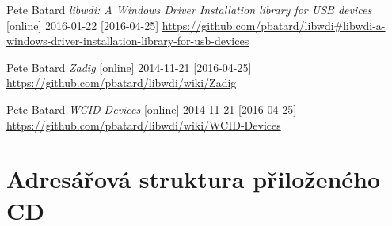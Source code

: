 \documentclass[czech,master,public,dept460,male,cpdeclaration]{diploma}	%
\begin{document}
\begin{thebibliography}{99}
 Pete Batard
\textit{libwdi: A Windows Driver Installation library for USB devices} [online] 2016-01-22 [2016-04-25]
\url{https://github.com/pbatard/libwdi#libwdi-a-windows-driver-installation-library-for-usb-devices}

 Pete Batard
\textit{Zadig} [online] 2014-11-21 [2016-04-25]
\url{https://github.com/pbatard/libwdi/wiki/Zadig}

 Pete Batard
\textit{WCID Devices} [online] 2014-11-21 [2016-04-25]
\url{https://github.com/pbatard/libwdi/wiki/WCID-Devices}

\end{thebibliography}




\appendix

\section{Adresářová struktura  přiloženého CD}
\label{sec:ap-cd}
\end{document}
